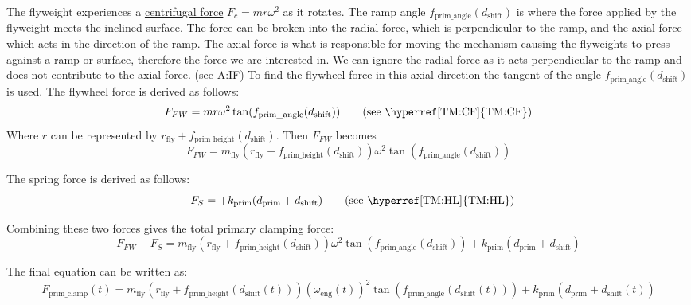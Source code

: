 \documentclass[12pt]{article}
\newcommand{\hpref}[1]{\hyperref[#1]{#1}}
\begin{document}
The flyweight experiences a \hyperref[TM:CF]{centrifugal force} {$F_c = m r\omega^2 $} as it rotates. 
The ramp angle $f_{\text{prim\_angle}}(d_{\text{shift}})$ is where the force applied by the flyweight meets the inclined surface.
The force can be broken into the radial force, which is perpendicular to the ramp, and the axial force which acts in the direction of the ramp.
The axial force is what is responsible for moving the mechanism causing the flyweights to press against a ramp or surface, therefore the force we are interested in.
We can ignore the radial force as it acts perpendicular to the ramp and does not contribute to the axial force. (see \hpref{A:IF})
To find the flywheel force in this axial direction the tangent of the angle $f_{\text{prim\_angle}}(d_{\text{shift}})$ is used.
The flywheel force is derived as follows: 
\[
F_{FW} = m r \omega^2 \tan(f_{\text{prim\_angle}}(d_{\text{shift}})) \tag*{\text{(see \hyperref[TM:CF]{TM:CF})}}
\]
Where \( r \) can be represented by \( r_{\text{fly}} + f_{\text{prim\_height}}(d_{\text{shift}}) \). Then \( F_{FW} \) becomes 
\[
F_{FW} = m_\text{fly} (r_{\text{fly}} + f_{\text{prim\_height}}(d_{\text{shift}}))\omega^2 \tan(f_{\text{prim\_angle}}(d_{\text{shift}}))
\]

The spring force is derived as follows: 
\[
-F_S = + k_{\text{prim}} (d_{\text{prim}} + d_{\text{shift}}) \tag*{\text{(see \hyperref[TM:HL]{TM:HL})}}
\]

Combining these two forces gives the total primary clamping force:
\[
F_{FW} - F_S =  m_\text{fly} (r_{\text{fly}} + f_{\text{prim\_height}}(d_{\text{shift}}))\omega^2 \tan(f_{\text{prim\_angle}}(d_{\text{shift}})) + k_{\text{prim}} (d_{\text{prim}} + d_{\text{shift}})
\]

The final equation can be written as:
\[
F_{\text{prim\_clamp}}(t) = m_\text{fly} (r_{\text{fly}} + f_{\text{prim\_height}}({d_\text{shift}(t)}))(\omega_\text{eng}(t))^2 \tan(f_{\text{prim\_angle}}(d_\text{shift}(t))) + k_{\text{prim}} (d_{\text{prim}} + d_\text{shift}(t))
\]
\end{document}
